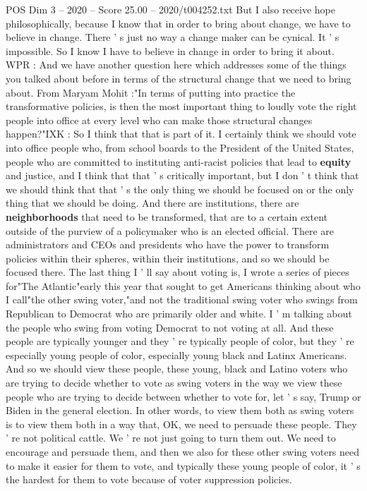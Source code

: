 \begin{textsample}{POS Dim 3 – 2020 – Score 25.00 – 2020/t004252.txt}
But I also receive hope philosophically, because I know that in order to bring about change, we have to believe in change.
There ' s just no way a change maker can be cynical.
It ' s impossible.
So I know I have to believe in change in order to bring it about.
WPR : And we have another question here which addresses some of the things you talked about before in terms of the structural change that we need to bring about.
From Maryam Mohit :"In terms of putting into practice the transformative policies, is then the most important thing to loudly vote the right people into office at every level who can make those structural changes happen?"IXK : So I think that that is part of it.
I certainly think we should vote into office people who, from school boards to the President of the United States, people who are committed to instituting anti-racist policies that lead to \textbf{equity} and justice, and I think that that ' s critically important, but I don ' t think that we should think that that ' s the only thing we should be focused on or the only thing that we should be doing.
And there are institutions, there are \textbf{neighborhoods} that need to be transformed, that are to a certain extent outside of the purview of a policymaker who is an elected official.
There are administrators and CEOs and presidents who have the power to transform policies within their spheres, within their institutions, and so we should be focused there.
The last thing I ' ll say about voting is, I wrote a series of pieces for"The Atlantic"early this year that sought to get Americans thinking about who I call"the other swing voter,"and not the traditional swing voter who swings from Republican to Democrat who are primarily older and white.
I ' m talking about the people who swing from voting Democrat to not voting at all.
And these people are typically younger and they ' re typically people of color, but they ' re especially young people of color, especially young black and Latinx Americans.
And so we should view these people, these young, black and Latino voters who are trying to decide whether to vote as swing voters in the way we view these people who are trying to decide between whether to vote for, let ' s say, Trump or Biden in the general election.
In other words, to view them both as swing voters is to view them both in a way that, OK, we need to persuade these people.
They ' re not political cattle.
We ' re not just going to turn them out.
We need to encourage and persuade them, and then we also for these other swing voters need to make it easier for them to vote, and typically these young people of color, it ' s the hardest for them to vote because of voter suppression policies.

\end{textsample}
